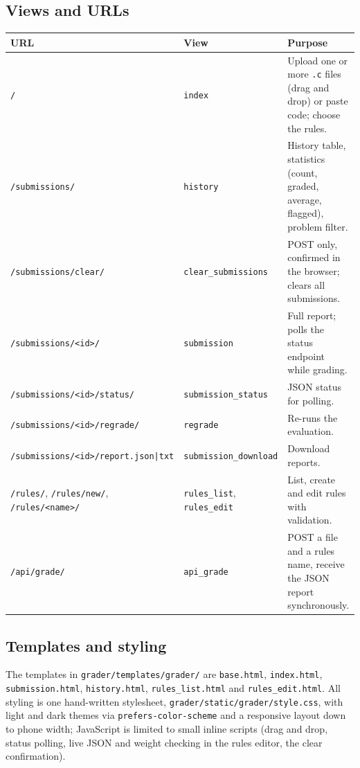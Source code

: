 \documentclass[11pt,a4paper]{article}
\newcommand{\file}[1]{\nolinkurl{#1}}
\newcommand{\fn}[1]{\nolinkurl{#1}}
\begin{document}
\subsection{Views and URLs}
\noindent\begin{tabularx}{\textwidth}{@{}>{\raggedright\arraybackslash}p{4.4cm}>{\raggedright\arraybackslash}p{3.3cm}L@{}}
\toprule
\textbf{URL} & \textbf{View} & \textbf{Purpose} \\
\midrule
\file{/} & \fn{index} & Upload one or more \texttt{.c} files (drag and drop) or paste code; choose the rules. \\
\file{/submissions/} & \fn{history} & History table, statistics (count, graded, average, flagged), problem filter. \\
\file{/submissions/clear/} & \fn{clear_submissions} & POST only, confirmed in the browser; clears all submissions. \\
\file{/submissions/<id>/} & \fn{submission} & Full report; polls the status endpoint while grading. \\
\file{/submissions/<id>/status/} & \fn{submission_status} & JSON status for polling. \\
\file{/submissions/<id>/regrade/} & \fn{regrade} & Re-runs the evaluation. \\
\file{/submissions/<id>/report.json|txt} & \fn{submission_download} & Download reports. \\
\file{/rules/}, \file{/rules/new/}, \file{/rules/<name>/} & \fn{rules_list}, \fn{rules_edit} & List, create and edit rules with validation. \\
\file{/api/grade/} & \fn{api_grade} & POST a file and a rules name, receive the JSON report synchronously. \\
\bottomrule
\end{tabularx}

\subsection{Templates and styling}
The templates in \file{grader/templates/grader/} are \file{base.html}, \file{index.html},
\file{submission.html}, \file{history.html}, \file{rules_list.html} and \file{rules_edit.html}. All styling is one
hand-written stylesheet, \file{grader/static/grader/style.css}, with light and dark themes via
\texttt{prefers-color-scheme} and a responsive layout down to phone width; JavaScript is limited to small inline
scripts (drag and drop, status polling, live JSON and weight checking in the rules editor, the clear confirmation).
\end{document}
